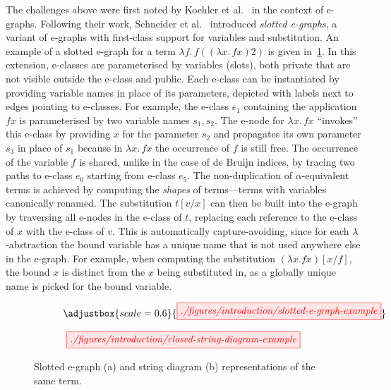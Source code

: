 The challenges above were first noted by Koehler et al.~\cite{koehler2022sketchguided} in the context of e-graphs.
Following their work, Schneider et al.~\cite{slotted-egraphs} introduced \emph{slotted e-graphs}, a variant of e-graphs with first-class support for variables and substitution.
An example of a slotted e-graph for a term $\lambda f .\, f ((\lambda x .\, f x) 2)$ is given in~\cref{fig:slotted-example}. 
In this extension, e-classes are parameterised by variables (slots), both private that are not visible outside the e-class and public.
Each e-class can be instantiated by providing variable names in place of its parameters, depicted with labels next to edges pointing to e-classes.
For example, the e-class $e_1$ containing the application $f x$ is parameterised by two variable names $s_1, s_2$.
The e-node for $\lambda x .\, f x$ \enquote{invokes} this e-class by providing $x$ for the parameter $s_2$ and propagates its own parameter $s_3$ in place of $s_1$ because in $\lambda x .\, f x$ the occurrence of $f$ is still free.
The occurrence of the variable $f$ is shared, unlike in the case of de Bruijn indices, by tracing two paths to e-class $e_0$ starting from e-class $e_5$.
The non-duplication of $\alpha$-equivalent terms is achieved by computing the \emph{shapes} of terms---terms with variables canonically renamed.
The substitution $t[v / x]$ can then be built into the e-graph by traversing all e-nodes in the e-class of $t$, replacing each reference to the e-class of $x$ with the e-class of $v$.
This is automatically capture-avoiding, since for each $\lambda$-abstraction the bound variable has a unique name that is not used anywhere else in the e-graph.
For example, when computing the substitution $(\lambda x . f x)[x / f]$, the bound $x$ is distinct from the $x$ being substituted in, as a globally unique name is picked for the bound variable.
\begin{figure}[t!]
		\begin{subfigure}{0.45\textwidth}
    \[
		\adjustbox{scale=0.6}{
			\tikzfig{./figures/introduction/slotted-e-graph-example}
		}
    \]
		\label{fig:slotted-example}
    \end{subfigure}
    \hfill
    \begin{subfigure}{0.45\textwidth}
     \[
    \tikzfig{./figures/introduction/closed-string-diagram-example}
    \]
    \label{fig:closed-string-diagram-example}
    \end{subfigure}
    \caption{Slotted e-graph (a) and string diagram (b) representations of the same term.}
\end{figure}


